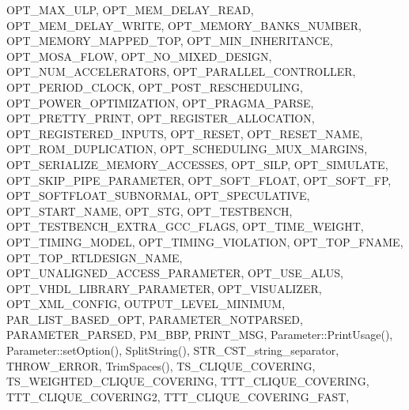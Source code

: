 O\+P\+T\+\_\+\+M\+A\+X\+\_\+\+U\+LP, O\+P\+T\+\_\+\+M\+E\+M\+\_\+\+D\+E\+L\+A\+Y\+\_\+\+R\+E\+AD, O\+P\+T\+\_\+\+M\+E\+M\+\_\+\+D\+E\+L\+A\+Y\+\_\+\+W\+R\+I\+TE, O\+P\+T\+\_\+\+M\+E\+M\+O\+R\+Y\+\_\+\+B\+A\+N\+K\+S\+\_\+\+N\+U\+M\+B\+ER, O\+P\+T\+\_\+\+M\+E\+M\+O\+R\+Y\+\_\+\+M\+A\+P\+P\+E\+D\+\_\+\+T\+OP, O\+P\+T\+\_\+\+M\+I\+N\+\_\+\+I\+N\+H\+E\+R\+I\+T\+A\+N\+CE, O\+P\+T\+\_\+\+M\+O\+S\+A\+\_\+\+F\+L\+OW, O\+P\+T\+\_\+\+N\+O\+\_\+\+M\+I\+X\+E\+D\+\_\+\+D\+E\+S\+I\+GN, O\+P\+T\+\_\+\+N\+U\+M\+\_\+\+A\+C\+C\+E\+L\+E\+R\+A\+T\+O\+RS, O\+P\+T\+\_\+\+P\+A\+R\+A\+L\+L\+E\+L\+\_\+\+C\+O\+N\+T\+R\+O\+L\+L\+ER, O\+P\+T\+\_\+\+P\+E\+R\+I\+O\+D\+\_\+\+C\+L\+O\+CK, O\+P\+T\+\_\+\+P\+O\+S\+T\+\_\+\+R\+E\+S\+C\+H\+E\+D\+U\+L\+I\+NG, O\+P\+T\+\_\+\+P\+O\+W\+E\+R\+\_\+\+O\+P\+T\+I\+M\+I\+Z\+A\+T\+I\+ON, O\+P\+T\+\_\+\+P\+R\+A\+G\+M\+A\+\_\+\+P\+A\+R\+SE, O\+P\+T\+\_\+\+P\+R\+E\+T\+T\+Y\+\_\+\+P\+R\+I\+NT, O\+P\+T\+\_\+\+R\+E\+G\+I\+S\+T\+E\+R\+\_\+\+A\+L\+L\+O\+C\+A\+T\+I\+ON, O\+P\+T\+\_\+\+R\+E\+G\+I\+S\+T\+E\+R\+E\+D\+\_\+\+I\+N\+P\+U\+TS, O\+P\+T\+\_\+\+R\+E\+S\+ET, O\+P\+T\+\_\+\+R\+E\+S\+E\+T\+\_\+\+N\+A\+ME, O\+P\+T\+\_\+\+R\+O\+M\+\_\+\+D\+U\+P\+L\+I\+C\+A\+T\+I\+ON, O\+P\+T\+\_\+\+S\+C\+H\+E\+D\+U\+L\+I\+N\+G\+\_\+\+M\+U\+X\+\_\+\+M\+A\+R\+G\+I\+NS, O\+P\+T\+\_\+\+S\+E\+R\+I\+A\+L\+I\+Z\+E\+\_\+\+M\+E\+M\+O\+R\+Y\+\_\+\+A\+C\+C\+E\+S\+S\+ES, O\+P\+T\+\_\+\+S\+I\+LP, O\+P\+T\+\_\+\+S\+I\+M\+U\+L\+A\+TE, O\+P\+T\+\_\+\+S\+K\+I\+P\+\_\+\+P\+I\+P\+E\+\_\+\+P\+A\+R\+A\+M\+E\+T\+ER, O\+P\+T\+\_\+\+S\+O\+F\+T\+\_\+\+F\+L\+O\+AT, O\+P\+T\+\_\+\+S\+O\+F\+T\+\_\+\+FP, O\+P\+T\+\_\+\+S\+O\+F\+T\+F\+L\+O\+A\+T\+\_\+\+S\+U\+B\+N\+O\+R\+M\+AL, O\+P\+T\+\_\+\+S\+P\+E\+C\+U\+L\+A\+T\+I\+VE, O\+P\+T\+\_\+\+S\+T\+A\+R\+T\+\_\+\+N\+A\+ME, O\+P\+T\+\_\+\+S\+TG, O\+P\+T\+\_\+\+T\+E\+S\+T\+B\+E\+N\+CH, O\+P\+T\+\_\+\+T\+E\+S\+T\+B\+E\+N\+C\+H\+\_\+\+E\+X\+T\+R\+A\+\_\+\+G\+C\+C\+\_\+\+F\+L\+A\+GS, O\+P\+T\+\_\+\+T\+I\+M\+E\+\_\+\+W\+E\+I\+G\+HT, O\+P\+T\+\_\+\+T\+I\+M\+I\+N\+G\+\_\+\+M\+O\+D\+EL, O\+P\+T\+\_\+\+T\+I\+M\+I\+N\+G\+\_\+\+V\+I\+O\+L\+A\+T\+I\+ON, O\+P\+T\+\_\+\+T\+O\+P\+\_\+\+F\+N\+A\+ME, O\+P\+T\+\_\+\+T\+O\+P\+\_\+\+R\+T\+L\+D\+E\+S\+I\+G\+N\+\_\+\+N\+A\+ME, O\+P\+T\+\_\+\+U\+N\+A\+L\+I\+G\+N\+E\+D\+\_\+\+A\+C\+C\+E\+S\+S\+\_\+\+P\+A\+R\+A\+M\+E\+T\+ER, O\+P\+T\+\_\+\+U\+S\+E\+\_\+\+A\+L\+US, O\+P\+T\+\_\+\+V\+H\+D\+L\+\_\+\+L\+I\+B\+R\+A\+R\+Y\+\_\+\+P\+A\+R\+A\+M\+E\+T\+ER, O\+P\+T\+\_\+\+V\+I\+S\+U\+A\+L\+I\+Z\+ER, O\+P\+T\+\_\+\+X\+M\+L\+\_\+\+C\+O\+N\+F\+IG, O\+U\+T\+P\+U\+T\+\_\+\+L\+E\+V\+E\+L\+\_\+\+M\+I\+N\+I\+M\+UM, P\+A\+R\+\_\+\+L\+I\+S\+T\+\_\+\+B\+A\+S\+E\+D\+\_\+\+O\+PT, P\+A\+R\+A\+M\+E\+T\+E\+R\+\_\+\+N\+O\+T\+P\+A\+R\+S\+ED, P\+A\+R\+A\+M\+E\+T\+E\+R\+\_\+\+P\+A\+R\+S\+ED, P\+M\+\_\+\+B\+BP, P\+R\+I\+N\+T\+\_\+\+M\+SG, Parameter\+::\+Print\+Usage(), Parameter\+::set\+Option(), Split\+String(), S\+T\+R\+\_\+\+C\+S\+T\+\_\+string\+\_\+separator, T\+H\+R\+O\+W\+\_\+\+E\+R\+R\+OR, Trim\+Spaces(), T\+S\+\_\+\+C\+L\+I\+Q\+U\+E\+\_\+\+C\+O\+V\+E\+R\+I\+NG, T\+S\+\_\+\+W\+E\+I\+G\+H\+T\+E\+D\+\_\+\+C\+L\+I\+Q\+U\+E\+\_\+\+C\+O\+V\+E\+R\+I\+NG, T\+T\+T\+\_\+\+C\+L\+I\+Q\+U\+E\+\_\+\+C\+O\+V\+E\+R\+I\+NG, T\+T\+T\+\_\+\+C\+L\+I\+Q\+U\+E\+\_\+\+C\+O\+V\+E\+R\+I\+N\+G2, T\+T\+T\+\_\+\+C\+L\+I\+Q\+U\+E\+\_\+\+C\+O\+V\+E\+R\+I\+N\+G\+\_\+\+F\+A\+ST, 
